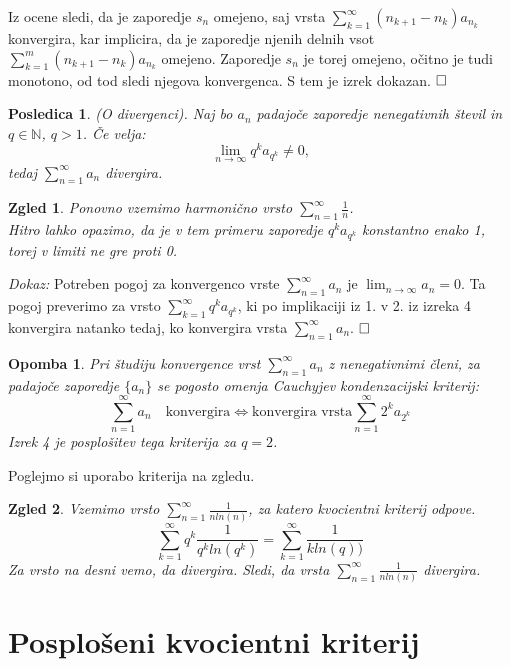 \documentclass[a4paper,12pt]{article}
\def\qed{$\hfill\Box$}   %
\newtheorem{posledica}{Posledica}
\newtheorem{opomba}{Opomba}
\newtheorem{zgled}{Zgled}
\begin{document}
Iz ocene sledi, da je zaporedje ${s_n}$ omejeno, saj vrsta $\sum_{k = 1}^{\infty}{(n_{k+1} - n_k)a_{n_k}}$ konvergira, 
kar implicira, da je zaporedje njenih delnih vsot $\sum_{k = 1}^{m}{(n_{k+1} - n_k)a_{n_k}}$ omejeno.
Zaporedje ${s_n}$ je torej omejeno, očitno je tudi monotono, od tod sledi njegova konvergenca.
S tem je izrek dokazan.
\qed

\begin{posledica}(O divergenci).
    Naj bo $a_n$ padajoče zaporedje nenegativnih števil in $ q \in {\mathbb{N}}$, $q > 1$. Če velja:
    \[
        \lim_{n \to \infty}{q^ka_{q^k}} \neq 0 \text{,} 
    \]
    tedaj $\sum_{n = 1}^{\infty}{a_n}$ divergira.
\end{posledica}

\begin{zgled}
    Ponovno vzemimo harmonično vrsto $\sum_{n = 1}^{\infty}{\frac{1}{n}}$. \\
    Hitro lahko opazimo, da je v tem primeru zaporedje $q^ka_{q^k}$ konstantno enako 1, torej v limiti ne gre proti 0.
\end{zgled}

\noindent
{\em Dokaz:\/}
Potreben pogoj za konvergenco vrste $\sum_{n = 1}^{\infty}{a_n}$ je
$\lim_{n \to \infty}{a_n} = 0$. Ta pogoj preverimo za vrsto $\sum_{k = 1}^{\infty}{q^ka_{q^k}}$,
ki po implikaciji iz 1. v 2. iz izreka 4 konvergira natanko tedaj, ko konvergira vrsta $\sum_{n = 1}^{\infty}{a_n}$.
\qed

\begin{opomba}
    Pri študiju konvergence vrst $\sum_{n = 1}^{\infty}{a_n}$ z nenegativnimi členi, 
    za padajoče zaporedje $\{a_n\}$ se pogosto omenja \emph{Cauchyjev kondenzacijski kriterij}:
    \[
        \sum_{n = 1}^{\infty}{a_n} \quad \text{konvergira} \iff \text{konvergira vrsta}
        \sum_{n = 1}^{\infty}{2^ka_{2^k}}
    \]
    Izrek 4 je posplošitev tega kriterija za $q = 2$.
\end{opomba}

\noindent
Poglejmo si uporabo kriterija na zgledu.
\begin{zgled}
    Vzemimo vrsto $\sum_{n = 1}^{\infty}{\frac{1}{nln(n)}}$, za katero kvocientni kriterij odpove.
    \[
        \sum_{k = 1}^{\infty}{q^k\frac{1}{q^kln(q^k)}} =
        \sum_{k = 1}^{\infty}{\frac{1}{kln(q))}}
    \]
    Za vrsto na desni vemo, da divergira. Sledi, da vrsta $\sum_{n = 1}^{\infty}{\frac{1}{nln(n)}}$ divergira.
\end{zgled}


\section{Posplošeni kvocientni kriterij}
\end{document}
